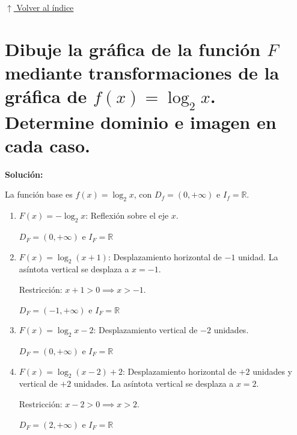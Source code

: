 \documentclass[12pt]{article}
\newcommand{\volverindice}{%
    \vspace{1em}%
    \begin{flushright}%
        \hyperlink{indice}{\small $\uparrow$ Volver al índice}%
    \end{flushright}%
}
\begin{document}
\volverindice
\newpage

\section[Transformaciones logarítmicas]{Dibuje la gráfica de la función $F$ mediante transformaciones de la gráfica de $f(x) = \log_2 x$. Determine dominio e imagen en cada caso.}

\textbf{Solución:}

La función base es $f(x) = \log_2 x$, con $D_f = (0, +\infty)$ e $I_f = \mathbb{R}$.

\begin{enumerate}[label=\alph*.-]

\item $F(x) = -\log_2 x$: Reflexión sobre el eje $x$.

$D_F = (0, +\infty)$ \quad e \quad $I_F = \mathbb{R}$

\item $F(x) = \log_2(x + 1)$: Desplazamiento horizontal de $-1$ unidad. La asíntota vertical se desplaza a $x = -1$.

Restricción: $x + 1 > 0 \implies x > -1$.

$D_F = (-1, +\infty)$ \quad e \quad $I_F = \mathbb{R}$

\item $F(x) = \log_2 x - 2$: Desplazamiento vertical de $-2$ unidades.

$D_F = (0, +\infty)$ \quad e \quad $I_F = \mathbb{R}$

\item $F(x) = \log_2(x - 2) + 2$: Desplazamiento horizontal de $+2$ unidades y vertical de $+2$ unidades. La asíntota vertical se desplaza a $x = 2$.

Restricción: $x - 2 > 0 \implies x > 2$.

$D_F = (2, +\infty)$ \quad e \quad $I_F = \mathbb{R}$

\end{enumerate}
\end{document}
